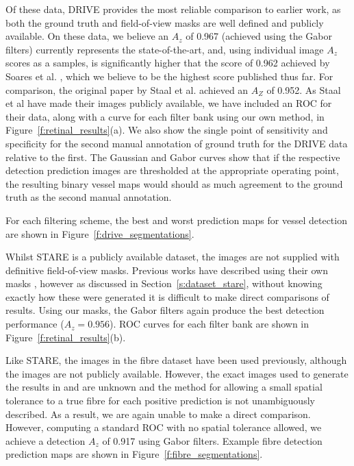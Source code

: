 \documentclass{IEEEtran}
\newcommand{\fref}[1]{Figure~\ref{#1}}
\newcommand{\sref}[1]{Section~\ref{#1}}
\begin{document}
Of these data, DRIVE provides the most reliable comparison to earlier work, as both the ground truth and field-of-view masks are well defined and publicly available. On these data, we believe an $A_z$ of 0.967 (achieved using the Gabor filters) currently represents the state-of-the-art, and, using individual image $A_z$ scores as a samples, is significantly higher that the score of 0.962 achieved by Soares et al. \cite{Soares_etal_TMI06}, which we believe to be the highest score published thus far. For comparison, the original paper by Staal et al. \cite{Staal_etal_TMI04} achieved an $A_Z$ of 0.952. As Staal et al have made their images publicly available, we have included an ROC for their data, along with a curve for each filter bank using our own method, in \fref{f:retinal_results}(a). We also show the single point of sensitivity and specificity for the second manual annotation of ground truth for the DRIVE data relative to the first. The Gaussian and Gabor curves show that if the respective detection prediction images are thresholded at the appropriate operating point, the resulting binary vessel maps would should as much agreement to the ground truth as the second manual annotation.

For each filtering scheme, the best and worst prediction maps for vessel detection are shown in \fref{f:drive_segmentations}.

Whilst STARE is a publicly available dataset, the images are not supplied with definitive field-of-view masks. Previous works have described using their own masks \cite{Staal_etal_TMI04}, however as discussed in \sref{s:dataset_stare}, without knowing exactly how these were generated it is difficult to make direct comparisons of results. Using our masks, the Gabor filters again produce the best detection performance ($A_z=0.956$). ROC curves for each filter bank are shown in \fref{f:retinal_results}(b).

Like STARE, the images in the fibre dataset have been used previously, although the images are not publicly available. However, the exact images used to generate the results in \cite{Dabbah_etal_MICCAI10} and \cite{Dabbah_etal_MIA11} are unknown and the method for allowing a small spatial tolerance to a true fibre for each positive prediction is not unambiguously described. As a result, we are again unable to make a direct comparison. However, computing a standard ROC with no spatial tolerance allowed, we achieve a detection $A_z$ of 0.917 using Gabor filters. Example fibre detection prediction maps are shown in \fref{f:fibre_segmentations}.
\end{document}
